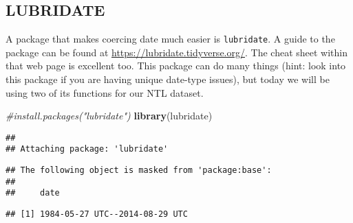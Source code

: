 \documentclass[]{article}
\newenvironment{Shaded}{\begin{snugshade}}{\end{snugshade}}
\newcommand{\KeywordTok}[1]{\textcolor[rgb]{0.13,0.29,0.53}{\textbf{#1}}}
\newcommand{\DataTypeTok}[1]{\textcolor[rgb]{0.13,0.29,0.53}{#1}}
\newcommand{\DecValTok}[1]{\textcolor[rgb]{0.00,0.00,0.81}{#1}}
\newcommand{\StringTok}[1]{\textcolor[rgb]{0.31,0.60,0.02}{#1}}
\newcommand{\CommentTok}[1]{\textcolor[rgb]{0.56,0.35,0.01}{\textit{#1}}}
\newcommand{\OperatorTok}[1]{\textcolor[rgb]{0.81,0.36,0.00}{\textbf{#1}}}
\newcommand{\NormalTok}[1]{#1}
\begin{document}
\subsection{LUBRIDATE}\label{lubridate}

A package that makes coercing date much easier is \texttt{lubridate}. A
guide to the package can be found at
\url{https://lubridate.tidyverse.org/}. The cheat sheet within that web
page is excellent too. This package can do many things (hint: look into
this package if you are having unique date-type issues), but today we
will be using two of its functions for our NTL dataset.

\begin{Shaded}
\begin{Highlighting}[]
\CommentTok{#install.packages("lubridate")}
\KeywordTok{library}\NormalTok{(lubridate)}
\end{Highlighting}
\end{Shaded}

\begin{verbatim}
## 
## Attaching package: 'lubridate'
\end{verbatim}

\begin{verbatim}
## The following object is masked from 'package:base':
## 
##     date
\end{verbatim}

\begin{Shaded}
\end{Shaded}

\begin{verbatim}
## [1] 1984-05-27 UTC--2014-08-29 UTC
\end{verbatim}
\end{document}
